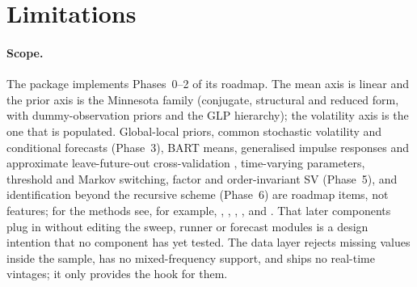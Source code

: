 \section{Limitations}\label{sec:limitations}

\paragraph{Scope.}
The package implements Phases~0--2 of its roadmap. The mean axis is linear and the prior axis is
the Minnesota family (conjugate, structural and reduced form, with dummy-observation priors and the
GLP hierarchy); the volatility axis is the one that is populated. %
Global-local priors, common stochastic volatility and conditional forecasts (Phase~3), BART means,
generalised impulse responses and approximate leave-future-out cross-validation
\citep[Phase~4;][]{burkner2020approximate}, time-varying parameters, threshold and Markov switching,
factor and order-invariant SV (Phase~5), and identification beyond the recursive scheme (Phase~6)
are roadmap items, not features; for the methods see, for example, \citet{huber2022inference},
\citet{clark2023tail}, \citet{gruber2025forecasting}, \citet{kastner2019sparse},
\citet{chan2024large} and \citet{bertsche2022identification}. %
That later components plug in without editing the sweep, runner or forecast modules is a design
intention that no component has yet tested. The data layer rejects missing values inside the
sample, has no mixed-frequency support, and ships no real-time vintages; it only provides the hook
for them. %

